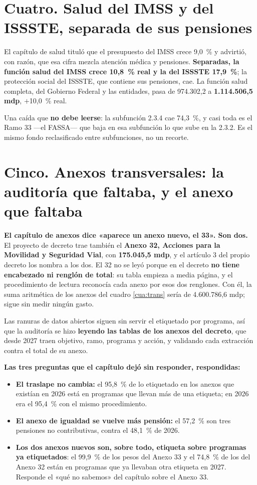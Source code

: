 \section*{Cuatro. Salud del IMSS y del ISSSTE, separada de sus pensiones}



El capítulo de salud tituló que el presupuesto del IMSS crece 9,0~\% y advirtió, con razón,
que esa cifra mezcla atención médica y pensiones. \textbf{Separadas, la función salud del
IMSS crece 10,8~\% real y la del ISSSTE 17,9~\%}; la protección social del ISSSTE, que
contiene sus pensiones, cae. La función salud completa, del Gobierno Federal y las
entidades, pasa de 974.302,2 a \textbf{1.114.506,5 mdp}, $+$10,0~\% real.

Una caída que \textbf{no debe leerse}: la subfunción 2.3.4 cae 74,3~\%, y casi toda es el
Ramo 33 ---el FASSA--- que baja en esa subfunción lo que sube en la 2.3.2. Es el mismo fondo
reclasificado entre subfunciones, no un recorte.

\section*{Cinco. Anexos transversales: la auditoría que faltaba, y el anexo que faltaba}

\textbf{El capítulo de anexos dice «aparece un anexo nuevo, el 33». Son dos.} El proyecto de
decreto trae también el \textbf{Anexo 32, Acciones para la Movilidad y Seguridad Vial},
con \textbf{175.045,5 mdp}, y el artículo 3 del propio decreto los nombra a los dos. El 32 no
se leyó porque en el decreto \textbf{no tiene encabezado ni renglón de total}: su tabla
empieza a media página, y el procedimiento de lectura reconocía cada anexo por esos dos
renglones. Con él, la suma aritmética de los anexos del cuadro \ref{cua:trans} sería
de 4.600.786,6 mdp; sigue sin medir ningún gasto.

Las ranuras de datos abiertos siguen sin servir el etiquetado por programa, así que la
auditoría se hizo \textbf{leyendo las tablas de los anexos del decreto}, que desde 2027 traen
objetivo, ramo, programa y acción, y validando cada extracción contra el total de su anexo.



\textbf{Las tres preguntas que el capítulo dejó sin responder, respondidas:}
\begin{itemize}
\item \textbf{El traslape no cambia:} el 95,8~\% de lo etiquetado en los anexos que existían
en 2026 está en programas que llevan más de una etiqueta; en 2026 era el 95,4~\% con el mismo
procedimiento.
\item \textbf{El anexo de igualdad se vuelve más pensión:} el 57,2~\% son tres pensiones no
contributivas, contra el 48,1~\% de 2026.
\item \textbf{Los dos anexos nuevos son, sobre todo, etiqueta sobre programas ya
etiquetados}: el 99,9~\% de los pesos del Anexo 33 y el 74,8~\% de los del Anexo 32 están
en programas que ya llevaban otra etiqueta en 2027. Responde el «qué no sabemos» del
capítulo sobre el Anexo 33.
\end{itemize}

